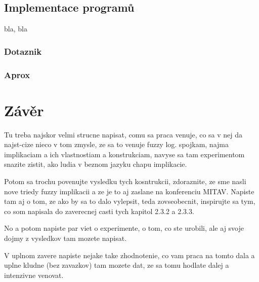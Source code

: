 \section{Implementace programů}
bla, bla
\subsection{Dotaznik}
\subsection{Aprox}

\chapter{Závěr}
{\color{red} Tu treba najskor velmi strucne napisat, comu sa praca venuje, co sa v nej da najst-cize nieco v tom zmysle, ze sa to venuje fuzzy log. spojkam, najma implikaciam a ich vlastnostiam a konstrukciam, navyse sa tam experimentom snazite zistit, ako ludia v beznom jazyku chapu implikacie. 

Potom sa trochu povenujte vysledku tych kosntrukcii, zdoraznite, ze sme nasli nove triedy fuzzy implikacii a ze je to aj zaslane na konferenciu MITAV. Napiste tam aj o tom, ze ako by sa to dalo vylepsit, teda zovseobecnit, inspirujte sa tym, co som napisala do zaverecnej casti tych kapitol 2.3.2 a 2.3.3.

No a potom napiste par viet o experimente, o tom, co ste urobili, ale aj svoje dojmy z vysledkov tam mozete napisat.

V uplnom zavere napiste nejake take zhodnotenie, co vam praca na tomto dala a uplne kludne (bez zavazkov) tam mozete dat, ze sa tomu hodlate dalej a intenzivne venovat.}

